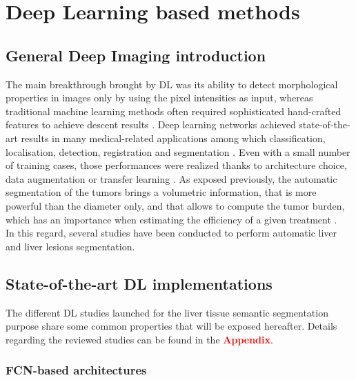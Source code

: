 \documentclass[]{article}
\begin{document}
	
	\section*{Deep Learning based methods}
	
	\subsection*{General Deep Imaging introduction}
	
	The main breakthrough brought by DL was its ability to detect
	morphological properties in images only by using the pixel intensities
	as input, whereas traditional machine learning methods often required
	sophisticated hand-crafted features to achieve descent results \cite{Litjens2017, Suzuki2017}. Deep learning networks achieved
	state-of-the-art results in many medical-related applications among
	which classification, localisation, detection, registration and
	segmentation \cite{Ker2017}. Even with a small number of
	training cases, those performances were realized thanks to architecture
	choice, data augmentation or transfer learning \cite{Zheng2018, Hu2018}.
	As exposed previously, the automatic segmentation of the tumors brings a
	volumetric information, that is more powerful than the diameter only,
	and that allows to compute the tumor burden, which has an importance
	when estimating the efficiency of a given treatment \cite{Gobbi2004, Bornemann2007, Heussel2007, Kuhnigk2006, Puesken2010, Bauknecht2010}.\\
	In this regard, several studies have been conducted to perform automatic
	liver and liver lesions segmentation.
	
	
	\subsection*{State-of-the-art DL implementations}
	
	The different DL studies launched for the liver tissue semantic
	segmentation purpose share some common properties that will be exposed
	hereafter. Details regarding the reviewed studies can be found in the
	\textcolor{red}{\textbf{Appendix}}.
	
	\subsubsection*{FCN-based architectures}
	
\end{document}
